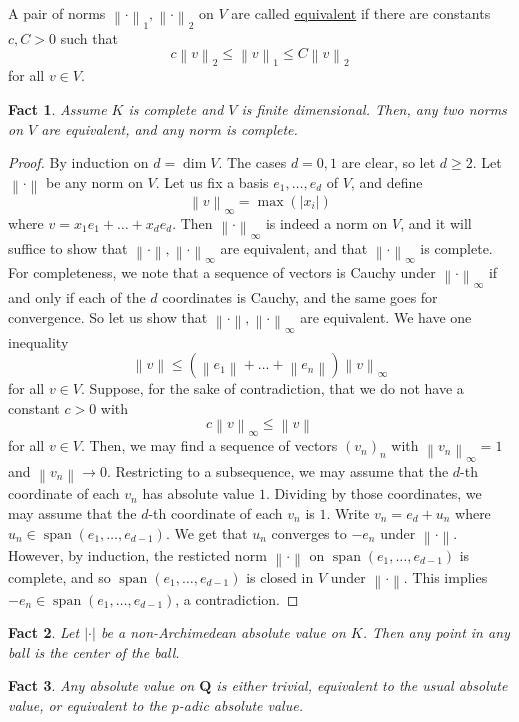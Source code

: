 \documentclass[12pt]{article}
\newtheorem*{fact*}{Fact}
\newcommand{\abs}[1]{\left\lvert#1\right\rvert}
\newcommand{\norm}[1]{\left\lVert#1\right\rVert}
\DeclareMathOperator{\spn}{span}
\newcommand{\too}{\longrightarrow}
\newcommand{\Q}{\mathbf{Q}}
\begin{document}
A pair of norms $\norm{\cdot}_1,\norm{\cdot}_2$ on $V$ are called \underline{equivalent} if there are constants $c,C>0$ such that \[ c\norm{v}_2 \le \norm{v}_1 \le C\norm{v}_2\]
for all $v\in V$.

 
\begin{fact*}
Assume $K$ is complete and $V$ is finite dimensional. Then, any two norms on $V$ are equivalent, and any norm is complete.
\end{fact*}


\begin{proof}
By induction on $d=\dim V$. The cases $d=0,1$ are clear, so let $d\ge 2$. Let $\norm{\cdot}$ be any norm on $V$. Let us fix a basis $e_1,\dots,e_d$ of $V$, and define
\[\norm{v}_\infty = \max(\abs{x_i})\]
where $v=x_1e_1+\dots+x_de_d$. Then $\norm{\cdot}_\infty$ is indeed a norm on $V$, and it will suffice to show that $\norm{\cdot},\norm{\cdot}_\infty$ are equivalent, and that $\norm{\cdot}_\infty$ is complete. For completeness, we note that a sequence of vectors is Cauchy under $\norm{\cdot}_\infty$ if and only if each of the $d$ coordinates is Cauchy, and the same goes for convergence. So let us show that $\norm{\cdot},\norm{\cdot}_\infty$ are equivalent. We have one inequality
\[\norm{v} \le (\norm{e_1}+\dots+\norm{e_n})\norm{v}_\infty\]
for all $v\in V$. Suppose, for the sake of contradiction, that we do not have a constant $c>0$ with 
\[c\norm{v}_\infty\le \norm{v}\]
for all $v\in V$.
Then, we may find a sequence of vectors $(v_n)_n$ with $\norm{v_n}_\infty = 1$ and $\norm{v_n}\too 0$. 
Restricting to a subsequence, we may assume that the $d$-th coordinate of each $v_n$ has absolute value $1$. 
Dividing by those coordinates, we may assume that the $d$-th coordinate of each $v_n$ is $1$. 
Write $v_n=e_d+u_n$ where $u_n\in\spn(e_1,\dots,e_{d-1})$. We get that $u_n$ converges to $-e_n$ under $\norm{\cdot}$. However,
by induction, the resticted norm $\norm{\cdot}$ on $\spn(e_1,\dots,e_{d-1})$ is complete, and so $\spn(e_1,\dots,e_{d-1})$ is closed in $V$ under $\norm{\cdot}$. This implies $-e_n\in \spn(e_1,\dots,e_{d-1})$, a contradiction. 
\end{proof}


\begin{fact*}
Let $\abs{\cdot}$ be a non-Archimedean absolute value on $K$. Then any point in any ball is the center of the ball.
\end{fact*}


\begin{fact*}
Any absolute value on $\Q$ is either trivial, equivalent to the usual absolute value, or equivalent to the $p$-adic absolute value.
\end{fact*}
\end{document}
